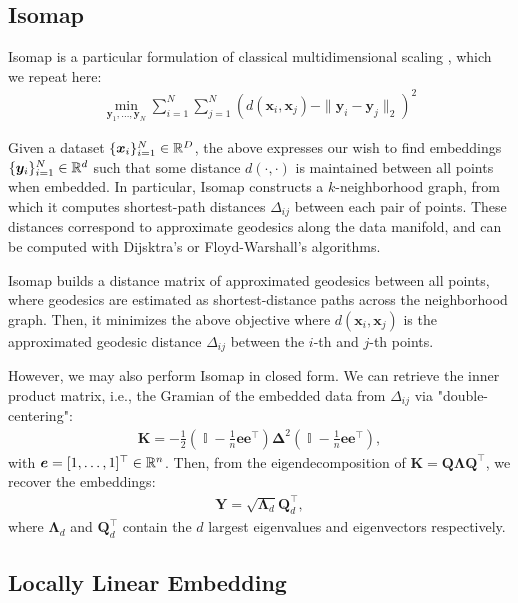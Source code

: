 \documentclass{article} %
\DeclareMathOperator{\I}{\mathbb{I}}
\begin{document}
\subsection{Isomap}

Isomap \citep{isomap} is a particular formulation of classical multidimensional scaling \citep{mds}, which we repeat here:
\begin{align}
\min_{\bm{y}_1,\ldots,\bm{y}_{N}} \sum_{i=1}^{N}\sum_{j=1}^{N} (d(\bm{x}_i, \bm{x}_j) - \|\bm{y}_i - \bm{y}_j\|_2)^2
\end{align}

Given a dataset $\{\bm{x}_i\}_{i=1}^N\in\mathbb{R}^D$, the above expresses our wish to find embeddings $\{\bm{y}_i\}_{i=1}^N\in\mathbb{R}^d$ such that some distance $d(\cdot,\cdot)$ is maintained between all points when embedded. In particular, Isomap constructs a $k$-neighborhood graph, from which it computes shortest-path distances $\Delta_{ij}$ between each pair of points. These distances correspond to approximate geodesics along the data manifold, and can be computed with Dijsktra's \citep{dijkstra} or Floyd-Warshall's \citep{floyd-warshall} algorithms.

Isomap \citep{isomap} builds a distance matrix of approximated geodesics between all points, where geodesics are estimated as shortest-distance paths across the neighborhood graph. Then, it minimizes the above objective where $d(\bm{x}_i,\bm{x}_j)$ is the approximated geodesic distance $\Delta_{ij}$ between the $i$-th and $j$-th points.

However, we may also perform Isomap in closed form. We can retrieve the inner product matrix, i.e., the Gramian of the embedded data from $\Delta_{ij}$ via "double-centering":
\begin{align}
    \bm{K}=-\frac{1}{2}(\I - \frac{1}{n}\bm{ee}^{\top})\bm{\Delta}^{2}(\I - \frac{1}{n}\bm{ee}^{\top}),
\end{align}
with $\bm{e}=[1,\dotsc,1]^{\top}\in\mathbb{R}^{n}$. Then, from the eigendecomposition of  $\bm{K}=\bm{Q\Lambda Q}^{\top}$, we recover the embeddings:
\begin{align}
    \bm{Y}=\sqrt{\bm{\Lambda}_{d}}\bm{Q}_{d}^{\top},
\end{align}
where $\bm{\Lambda}_{d}$ and $\bm{Q}_{d}^{\top}$ contain the $d$ largest eigenvalues and eigenvectors respectively.

\subsection{Locally Linear Embedding}
\end{document}
